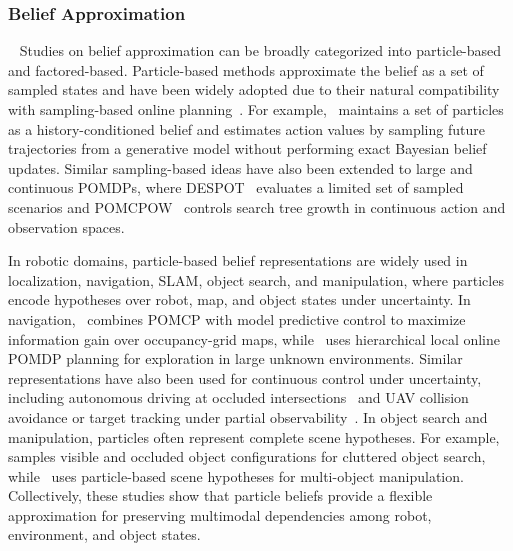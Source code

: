 \subsubsection{Belief Approximation}~\label{rel:pu_belief_approx}
Studies on belief approximation can be broadly categorized into particle-based and factored-based. Particle-based methods approximate the belief as a set of sampled states and have been widely adopted due to their natural compatibility with sampling-based online planning~\cite{doshi2005particle, lim2023optimality}. For example,~\cite{silver2010monte} maintains a set of particles as a history-conditioned belief and estimates action values by sampling future trajectories from a generative model without performing exact Bayesian belief updates. Similar sampling-based ideas have also been extended to large and continuous POMDPs, where DESPOT~\cite{somani2013despot} evaluates a limited set of sampled scenarios and POMCPOW~\cite{sunberg2018pomcpow} controls search tree growth in continuous action and observation spaces.


In robotic domains, particle-based belief representations are widely used in localization, navigation, SLAM, object search, and manipulation, where particles encode hypotheses over robot, map, and object states under uncertainty. In navigation,~\cite{lauri2016exploration} combines POMCP with model predictive control to maximize information gain over occupancy-grid maps, while~\cite{kim2021plgrim} uses hierarchical local online POMDP planning for exploration in large unknown environments. Similar representations have also been used for continuous control under uncertainty, including autonomous driving at occluded intersections~\cite{brechtel2014continuous} and UAV collision avoidance or target tracking under partial observability~\cite{bai2011uav,vanegas2016uav}. In object search and manipulation, particles often represent complete scene hypotheses. For example,~\cite{xiao2019objectsearch} samples visible and occluded object configurations for cluttered object search, while~\cite{pajarinen2017multiobject,pajarinen2022composition} uses particle-based scene hypotheses for multi-object manipulation. Collectively, these studies show that particle beliefs provide a flexible approximation for preserving multimodal dependencies among robot, environment, and object states.


